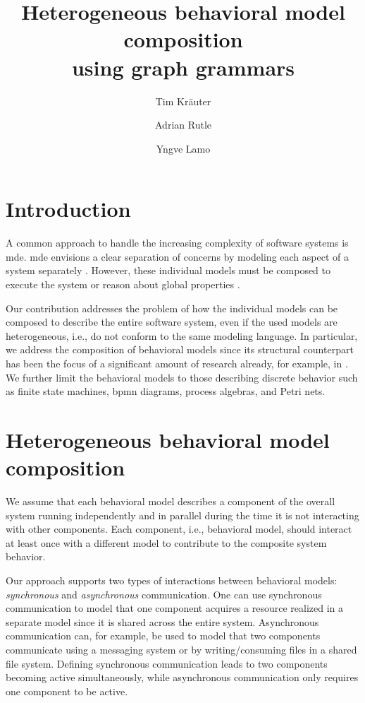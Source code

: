 \documentclass[a4paper]{easychair}
\title{Heterogeneous behavioral model composition \\
        using graph grammars}
\author{
Tim Kräuter
\and
Adrian Rutle
\and
Yngve Lamo
}
\institute{
  Høgskulen på Vestlandet\\
  Bergen, Norway\\
  \email{tkra@hvl.no}
 }
\begin{document}
\maketitle

\section{Introduction}
A common approach to handle the increasing complexity of software systems is \gls*{mde}.
\gls*{mde} envisions a clear separation of concerns by modeling each aspect of a system separately \cite{franceModeldrivenDevelopmentComplex2007}.
However, these individual models must be composed to execute the system or reason about global properties \cite{kienzleUnifyingFrameworkHomogeneous2019}.

Our contribution addresses the problem of how the individual models can be composed to describe the entire software system, even if the used models are heterogeneous, i.e., do not conform to the same modeling language.
In particular, we address the composition of behavioral models since its structural counterpart has been the focus of a significant amount of research already, for example, in \cite{kienzleUnifyingFrameworkHomogeneous2019, klareCommonalitiesPreservingConsistency2019, stunkelComprehensiveSystemsFormal2021}.
We further limit the behavioral models to those describing discrete behavior such as finite state machines, \gls*{bpmn} diagrams, process algebras, and Petri nets. %


\section{Heterogeneous behavioral model composition}
We assume that each behavioral model describes a component of the overall system running independently and in parallel during the time it is not interacting with other components.
Each component, i.e., behavioral model, should interact at least once with a different model to contribute to the composite system behavior.

Our approach supports two types of interactions between behavioral models: \textit{synchronous} and \textit{asynchronous} communication.
One can use synchronous communication to model that one component acquires a resource realized in a separate model since it is shared across the entire system.
Asynchronous communication can, for example, be used to model that two components communicate using a messaging system or by writing/consuming files in a shared file system.
Defining synchronous communication leads to two components becoming active simultaneously, while asynchronous communication only requires one component to be active. 
\end{document}
